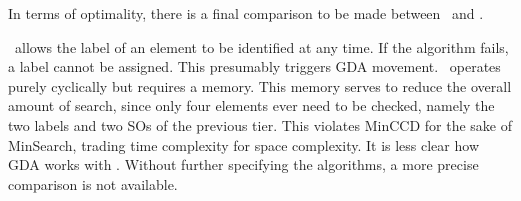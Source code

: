 In terms of optimality, there is a final comparison to be made between \LabelTD\ and \LabelBU.

\LabelTD\ allows the label of an element to be identified at any time. If the algorithm fails, a label cannot be assigned. This presumably triggers GDA movement. \LabelBU\ operates purely cyclically but requires a memory. This memory serves to reduce the overall amount of search, since only four elements ever need to be checked, namely the two labels and two SOs of the previous tier. This violates MinCCD for the sake of MinSearch, trading time complexity for space complexity. It is less clear how GDA works with \LabelBU. Without further specifying the algorithms, a more precise comparison is not available.
